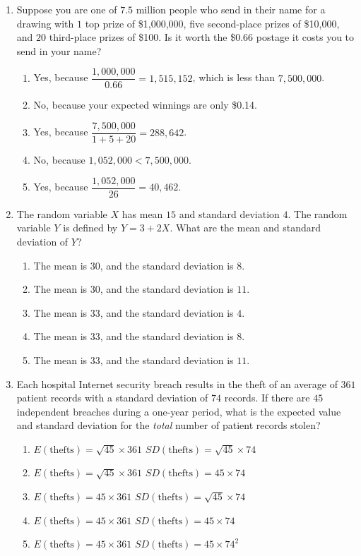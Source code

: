 \documentclass{article}
\begin{document}
\begin{enumerate}[label=\textbf{S\arabic*.}]
\item Suppose you are one of $7.5$ million people who send in their name for a drawing with $1$ top prize of \$1{,}000{,}000, five second-place prizes of \$10{,}000, and $20$ third-place prizes of \$100. Is it worth the \$0.66 postage it costs you to send in your name? 
\begin{enumerate}
  \item Yes, because $\dfrac{1{,}000{,}000}{0.66}=1{,}515{,}152$, which is less than $7{,}500{,}000$.
  \item No, because your expected winnings are only \$0.14.
  \item Yes, because $\dfrac{7{,}500{,}000}{1+5+20}=288{,}642$.
  \item No, because $1{,}052{,}000<7{,}500{,}000$.
  \item Yes, because $\dfrac{1{,}052{,}000}{26}=40{,}462$.
\end{enumerate}

\item The random variable $X$ has mean $15$ and standard deviation $4$. The random variable $Y$ is defined by $Y=3+2X$. What are the mean and standard deviation of $Y$? 
\begin{enumerate}
  \item The mean is $30$, and the standard deviation is $8$.
  \item The mean is $30$, and the standard deviation is $11$.
  \item The mean is $33$, and the standard deviation is $4$.
  \item The mean is $33$, and the standard deviation is $8$.
  \item The mean is $33$, and the standard deviation is $11$.
\end{enumerate}

\item Each hospital Internet security breach results in the theft of an average of $361$ patient records with a standard deviation of $74$ records. If there are $45$ independent breaches during a one-year period, what is the expected value and standard deviation for the \emph{total} number of patient records stolen? 
\begin{enumerate}
  \item $E(\text{thefts})=\sqrt{45}\times361$ \quad $SD(\text{thefts})=\sqrt{45}\times74$
  \item $E(\text{thefts})=\sqrt{45}\times361$ \quad $SD(\text{thefts})=45\times74$
  \item $E(\text{thefts})=45\times361$ \quad $SD(\text{thefts})=\sqrt{45}\times74$
  \item $E(\text{thefts})=45\times361$ \quad $SD(\text{thefts})=45\times74$
  \item $E(\text{thefts})=45\times361$ \quad $SD(\text{thefts})=45\times74^{2}$
\end{enumerate}


\end{enumerate}
\end{document}
